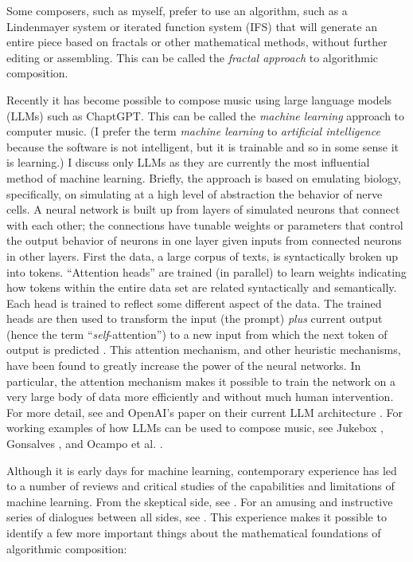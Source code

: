 \documentclass[11pt]{scrartcl}
\begin{document}
Some composers, such as myself, prefer to use an algorithm, such as a Lindenmayer system \parencite{algorithmicbeautyofplants, prusinkiewicz1986sgs,  fractalmusicwithstringrewritinggrammars} or iterated function system (IFS) \parencite{fractalseverywhere, ifsmusic} that will generate an entire piece based on fractals or other mathematical methods, without further editing or assembling. This can be called the \emph{fractal approach} to algorithmic composition.

Recently it has become possible to compose music using large language models (LLMs) such as ChaptGPT. This can be called the \emph{machine learning} approach to computer music. (I prefer the term \emph{machine learning} to \emph{artificial intelligence} because the software is not intelligent, but it is trainable and so in some sense it is learning.) I discuss only LLMs as they are currently the most influential method of machine learning. Briefly, the approach is based on emulating biology, specifically, on simulating at a high level of abstraction the behavior of nerve cells. A neural network is built up from layers of simulated neurons that connect with each other; the connections have tunable weights or parameters that control the output behavior of neurons in one layer given inputs from connected neurons in other layers. First the data, a large corpus of texts, is syntactically broken up into tokens. ``Attention heads'' are trained (in parallel) to learn weights indicating how tokens within the entire data set are related syntactically and semantically. Each head is trained to reflect some different aspect of the data. The trained heads are then used to transform the input (the prompt) \emph{plus} current output (hence the term ``\emph{self}-attention'') to a new input from which the next token of output is predicted \parencite{vaswani2017attention}. This attention mechanism, and other heuristic mechanisms, have been found to greatly increase the power of the neural networks. In particular, the attention mechanism makes it possible to train the network on a very large body of data more efficiently and without much human intervention. For more detail, see \parencite{zhang2023complete} and OpenAI's paper on their current LLM architecture \parencite{openai2023gpt4}. For working examples of how LLMs can be used to compose music, see Jukebox \parencite{openai2023jukebox}, Gonsalves \parencite{aitunes}, and Ocampo et al. \parencite{ocampo2023using}.

Although it is early days for machine learning, contemporary experience has led to a number of reviews and critical studies of the capabilities and limitations of machine learning. From the skeptical side, see \parencite{dale2021gpt}. For an amusing and instructive series of dialogues between all sides, see \parencite{shtetl}. This experience makes it possible to identify a few more important things about the mathematical foundations of algorithmic composition:
\end{document}
